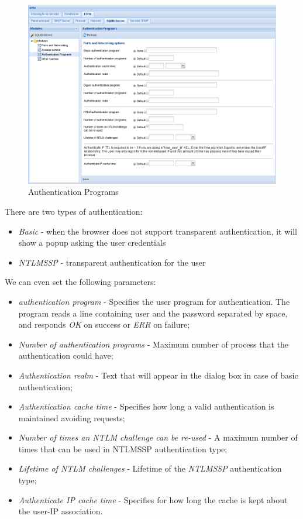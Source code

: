 \begin{figure}[H]
    \begin{center}
    \includegraphics[scale=0.38]{screenshots/etfw/etfw_squid_authenticationprograms_01.png}
    \caption{Authentication Programs}
    \label{fig:etfw_squid_authenticationprograms_01}
    \end{center}
\end{figure}

There are two types of authentication:

\begin{itemize}
    \item \textit{Basic} - when the browser does not support transparent authentication, it will show a popup asking the user credentials
    \item \textit{NTLMSSP} - transparent authentication for the user
\end{itemize}

We can even set the following parameters:

\begin{itemize}
    \item \textit{authentication program} - Specifies the user program for authentication. The program reads a line containing user and the password separated by space, and responds \textit{OK} on success or \textit{ERR} on failure;
    \item \textit{Number of authentication programs} - Maximum number of process that the authentication could have;
    \item \textit{Authentication realm} - Text that will appear in the dialog box in case of basic authentication;
    \item \textit{Authentication cache time} - Specifies how long a valid authentication is maintained avoiding requests;
    \item \textit{Number of times an NTLM challenge can be re-used} - A maximum number of times that can be used in NTLMSSP authentication type;
    \item \textit{Lifetime of NTLM challenges} - Lifetime of the \textit{NTLMSSP} authentication type;
    \item \textit{Authenticate IP cache time} - Specifies for how long the cache is kept about the user-IP association. 
\end{itemize}

